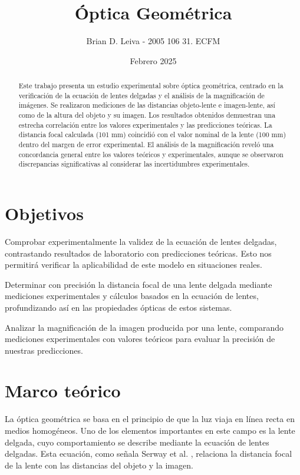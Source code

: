 \documentclass[twocolumn,a4paper,11pt]{scrartcl}
\title{Óptica Geométrica}
\author{Brian D. Leiva - 2005 106 31. ECFM}
\date{Febrero 2025}
\begin{document}
\maketitle

\begin{abstract}
Este trabajo presenta un estudio experimental sobre óptica geométrica, centrado en la verificación de la ecuación de lentes delgadas y el análisis de la magnificación de imágenes. Se realizaron mediciones  de las distancias objeto-lente e imagen-lente, así como de la altura del objeto y su imagen. Los resultados obtenidos demuestran una estrecha correlación entre los valores experimentales y las predicciones teóricas. 
La distancia focal calculada (101 mm) coincidió con el valor nominal de la lente (100 mm) dentro del margen de error experimental. El análisis de la magnificación reveló una concordancia general entre los valores teóricos y experimentales, aunque se observaron discrepancias significativas al considerar las incertidumbres experimentales.
\end{abstract}

\section{Objetivos}

Comprobar experimentalmente la validez de la ecuación de lentes delgadas, contrastando resultados de laboratorio con predicciones teóricas. Esto nos permitirá verificar la aplicabilidad de este modelo en situaciones reales.

Determinar con precisión la distancia focal de una lente delgada mediante mediciones experimentales y cálculos basados en la ecuación de lentes, profundizando así en las propiedades ópticas de estos sistemas.

Analizar la magnificación de la imagen producida por una lente, comparando mediciones experimentales con valores teóricos para evaluar la precisión de nuestras predicciones.


\section{Marco teórico}
La óptica geométrica se basa en el principio de que la luz viaja en línea recta en medios homogéneos. Uno de los elementos importantes en este campo es la lente delgada, cuyo comportamiento se describe mediante la ecuación de lentes delgadas. Esta ecuación, como señala Serway et al. \cite{serway}, relaciona la distancia focal de la lente con las distancias del objeto y la imagen.
\end{document}
